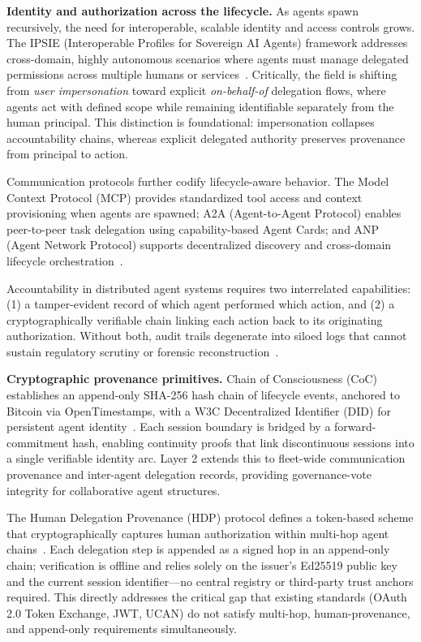 \textbf{Identity and authorization across the lifecycle.} As agents spawn recursively, the need for interoperable, scalable identity and access controls grows. The IPSIE (Interoperable Profiles for Sovereign AI Agents) framework addresses cross-domain, highly autonomous scenarios where agents must manage delegated permissions across multiple humans or services~\cite{ipsiene2025}. Critically, the field is shifting from \textit{user impersonation} toward explicit \textit{on-behalf-of} delegation flows, where agents act with defined scope while remaining identifiable separately from the human principal. This distinction is foundational: impersonation collapses accountability chains, whereas explicit delegated authority preserves provenance from principal to action.

Communication protocols further codify lifecycle-aware behavior. The Model Context Protocol (MCP) provides standardized tool access and context provisioning when agents are spawned; A2A (Agent-to-Agent Protocol) enables peer-to-peer task delegation using capability-based Agent Cards; and ANP (Agent Network Protocol) supports decentralized discovery and cross-domain lifecycle orchestration~\cite{protocols2025}.


Accountability in distributed agent systems requires two interrelated capabilities: (1) a tamper-evident record of which agent performed which action, and (2) a cryptographically verifiable chain linking each action back to its originating authorization. Without both, audit trails degenerate into siloed logs that cannot sustain regulatory scrutiny or forensic reconstruction~\cite{vap2026, trusttrack2025}.

\textbf{Cryptographic provenance primitives.} Chain of Consciousness (CoC) establishes an append-only SHA-256 hash chain of lifecycle events, anchored to Bitcoin via OpenTimestamps, with a W3C Decentralized Identifier (DID) for persistent agent identity~\cite{chainofconsciousness2026}. Each session boundary is bridged by a forward-commitment hash, enabling continuity proofs that link discontinuous sessions into a single verifiable identity arc. Layer 2 extends this to fleet-wide communication provenance and inter-agent delegation records, providing governance-vote integrity for collaborative agent structures.

The Human Delegation Provenance (HDP) protocol defines a token-based scheme that cryptographically captures human authorization within multi-hop agent chains~\cite{hdp2026}. Each delegation step is appended as a signed hop in an append-only chain; verification is offline and relies solely on the issuer's Ed25519 public key and the current session identifier---no central registry or third-party trust anchors required. This directly addresses the critical gap that existing standards (OAuth 2.0 Token Exchange, JWT, UCAN) do not satisfy multi-hop, human-provenance, and append-only requirements simultaneously.

